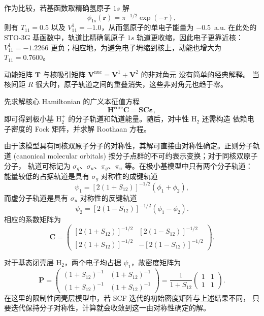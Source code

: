\documentclass[fontset=none,12pt,a4paper]{ctexart}
\numberwithin{equation}{section}
\begin{document}
作为比较，若基函数取精确氢原子 $1s$ 解
\begin{equation}
  \phi_{1s}(\mathbf{r})=\pi^{-1/2}\exp(-r),
\end{equation}
则有 $T_{11}=0.5$ 以及 $V^{1}_{11}=-1.0$，从而氢原子的单电子能量为 $-0.5$~a.u.
在此处的 STO-3G 基函数中，轨道比精确氢原子 $1s$ 轨道更收缩，因此电子更靠近核：
$V^{1}_{11}=-1.2266$ 更负；相应地，为避免电子坍缩到核上，动能也增大为 $T_{11}=0.7600$。

动能矩阵 $\mathbf{T}$ 与核吸引矩阵 $\mathbf{V}^{\mathrm{nuc}}=\mathbf{V}^{1}+\mathbf{V}^{2}$ 的非对角元
没有简单的经典解释。
当核间距 $R$ 很大时，原子轨道之间的重叠消失，这些非对角元也趋于零。

先求解核心 Hamiltonian 的广义本征值方程
\begin{equation}
  \mathbf{H}^{\mathrm{core}}\mathbf{C}
  =\mathbf{S}\mathbf{C}\boldsymbol{\varepsilon},
\end{equation}
即可得到极小基 $\mathrm{H}_2^+$ 的分子轨道和轨道能量。随后，对中性 $\mathrm{H}_2$ 还需构造
依赖电子密度的 Fock 矩阵，并求解 Roothaan 方程。

由于该模型具有同核双原子分子的对称性，其解可直接由对称性确定。正则分子轨道
(canonical molecular orbitals) 按分子点群的不可约表示变换；对于同核双原子分子，
轨道可标记为 $\sigma_g$、$\sigma_u$、$\pi_g$、$\pi_u$ 等。在极小基模型中只有两个分子轨道：
能量较低的占据轨道是具有 $\sigma_g$ 对称性的成键轨道
\begin{equation}
  \psi_1=[2(1+S_{12})]^{-1/2}(\phi_1+\phi_2),
\end{equation}
而虚分子轨道是具有 $\sigma_u$ 对称性的反键轨道
\begin{equation}
  \psi_2=[2(1-S_{12})]^{-1/2}(\phi_1-\phi_2).
\end{equation}
相应的系数矩阵为
\begin{equation}
  \mathbf{C}=
  \begin{pmatrix}
    [2(1+S_{12})]^{-1/2} & [2(1-S_{12})]^{-1/2} \\
    [2(1+S_{12})]^{-1/2} & -[2(1-S_{12})]^{-1/2}
  \end{pmatrix}.
\end{equation}

对于基态闭壳层 $\mathrm{H}_2$，两个电子均占据 $\psi_1$，故密度矩阵为
\begin{equation}
  \mathbf{P}=
  \begin{pmatrix}
    (1+S_{12})^{-1} & (1+S_{12})^{-1} \\
    (1+S_{12})^{-1} & (1+S_{12})^{-1}
  \end{pmatrix}
  =\frac{1}{1+S_{12}}
  \begin{pmatrix}
    1 & 1 \\
    1 & 1
  \end{pmatrix}.
\end{equation}
在这里的限制性闭壳层模型中，若 SCF 迭代的初始密度矩阵与上述结果不同，
只要迭代保持分子对称性，计算就会收敛到这一由对称性确定的解。
\end{document}
